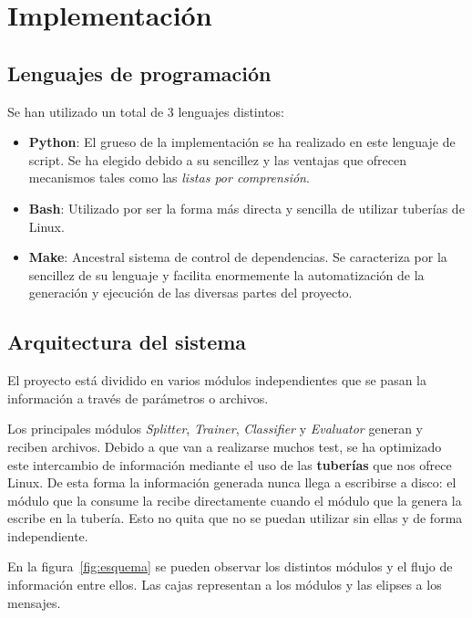 \section{Implementación}

\subsection[Lenguajes]{Lenguajes de programación}

Se han utilizado un total de 3 lenguajes distintos:

\begin{itemize}
	\item \textbf{Python}: El grueso de la implementación se ha realizado en
		este lenguaje de script. Se ha elegido debido a su sencillez y
		las ventajas que ofrecen mecanismos tales como las \textit{listas por
		comprensión}.
	\item \textbf{Bash}: Utilizado por ser la forma más directa y sencilla
		de utilizar tuberías de Linux.
	\item \textbf{Make}: Ancestral sistema de control de dependencias. Se
		caracteriza por la sencillez de su lenguaje y facilita
		enormemente la automatización de la generación y ejecución de
		las diversas partes del proyecto.
\end{itemize}

\subsection[Arquitectura]{Arquitectura del sistema}

El proyecto está dividido en varios módulos independientes que se pasan la
información a través de parámetros o archivos.

Los principales módulos \textit{Splitter}, \textit{Trainer}, \textit{Classifier}
y \textit{Evaluator} generan y reciben archivos. Debido a que van a realizarse
muchos test, se ha optimizado este intercambio de información mediante el uso de
las \textbf{tuberías} que nos ofrece Linux. De esta forma la información
generada nunca llega a escribirse a disco: el módulo que la consume la recibe
directamente cuando el módulo que la genera la escribe en la tubería. Esto no
quita que no se puedan utilizar sin ellas y de forma independiente.

En la figura~\ref{fig:esquema} se pueden observar los distintos módulos y el
flujo de información entre ellos. Las cajas representan a los módulos y las
elipses a los mensajes.

